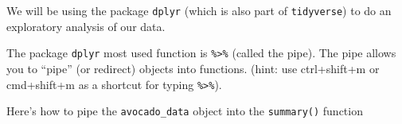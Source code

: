 \documentclass[
]{book}
\newenvironment{Shaded}{\begin{snugshade}}{\end{snugshade}}
\newcommand{\CommentTok}[1]{\textcolor[rgb]{0.56,0.35,0.01}{\textit{#1}}}
\newcommand{\KeywordTok}[1]{\textcolor[rgb]{0.13,0.29,0.53}{\textbf{#1}}}
\newcommand{\NormalTok}[1]{#1}
\newcommand{\OperatorTok}[1]{\textcolor[rgb]{0.81,0.36,0.00}{\textbf{#1}}}
\newcommand{\StringTok}[1]{\textcolor[rgb]{0.31,0.60,0.02}{#1}}
\begin{document}
We will be using the package \texttt{dplyr} (which is also part of \texttt{tidyverse}) to do an exploratory analysis of our data.

The package \texttt{dplyr} most used function is \texttt{\%\textgreater{}\%} (called the pipe). The pipe allows you to ``pipe'' (or redirect) objects into functions. (hint: use ctrl+shift+m or cmd+shift+m as a shortcut for typing \texttt{\%\textgreater{}\%}).

Here's how to pipe the \texttt{avocado\_data} object into the \texttt{summary()} function

\begin{Shaded}
\end{Shaded}
\end{document}
